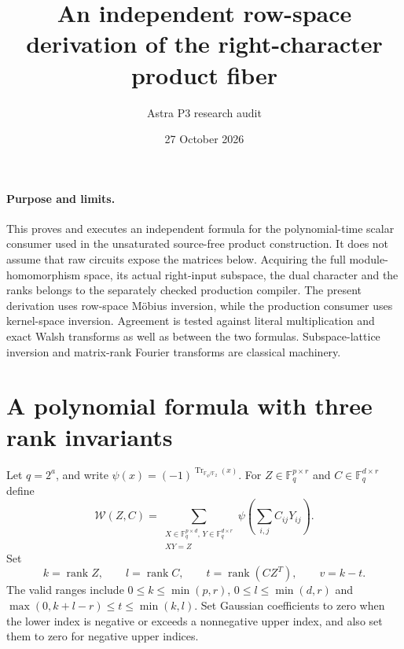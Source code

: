\documentclass[11pt]{article}
\title{An independent row-space derivation of the right-character product fiber}
\author{Astra P3 research audit}
\date{27 October 2026}
\newcommand{\F}{\mathbb F}
\newcommand{\rank}{\operatorname{rank}}
\begin{document}
\maketitle

\paragraph{Purpose and limits.}
This proves and executes an independent formula for the polynomial-time
scalar consumer used in the unsaturated source-free product construction.
It does not assume that raw circuits expose the matrices below. Acquiring
the full module-homomorphism space, its actual right-input subspace, the
dual character and the ranks belongs to the separately checked production
compiler. The present derivation uses row-space M\"obius inversion, while
the production consumer uses kernel-space inversion. Agreement is tested
against literal multiplication and exact Walsh transforms as well as
between the two formulas. Subspace-lattice inversion and matrix-rank
Fourier transforms are classical machinery.

\section{A polynomial formula with three rank invariants}

Let $q=2^a$, and write $\psi(x)=(-1)^{\operatorname{Tr}_{\F_q/\F_2}(x)}$.
For $Z\in\F_q^{p\times r}$ and $C\in\F_q^{d\times r}$ define
\[
 \mathcal W(Z,C)=
 \sum_{\substack{X\in\F_q^{p\times d},\,Y\in\F_q^{d\times r}\\XY=Z}}
       \psi\left(\sum_{i,j}C_{ij}Y_{ij}\right).
\]
Set
\[
 k=\rank Z,\qquad l=\rank C,\qquad t=\rank(CZ^T),\qquad v=k-t.
\]
The valid ranges include
$0\le k\le\min(p,r)$, $0\le l\le\min(d,r)$ and
$\max(0,k+l-r)\le t\le\min(k,l)$.
Set Gaussian coefficients to zero when the lower index is negative or
exceeds a nonnegative upper index, and also set them to zero for negative
upper indices.
\end{document}
